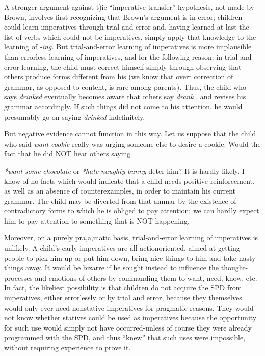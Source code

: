 A stronger argument against t)ie ``imperative transfer'' hypothesis,
not made by Brown, involves first recognizing that Brown's argument is in error; children could learn imperatives through trial and error and, having learned at last the list of verbs which could not be imperatives, simply apply that knowledge to the learning of \textit{{}-ing.} But trial-and-error learning of imperatives is more implausible than errorless learning of imperatives, and for the following reason: in trial-and-error learning, the child must correct himself simply through observing that others produce forms different from his (we know that overt correction of grammar, as opposed to content, is rare among parents). Thus, the child who says \textit{drinked} eventually becomes aware that others say \textit{drank} , and revises his grammar accordingly. If such things did not come to his attention, he would presumably go on saying \textit{d}\textit{rinked} indefinitely.

But negative evidence cannot function in this way. Let us sup\-pose that the child who said \textit{want} \textit{cookie} really was urging someone else to desire a cookie. Would the fact that he did NOT hear others saying

\textit{*want} \textit{some} \textit{chocolate} or \textit{*hate} \textit{naughty} \textit{bunny} deter him? It is hardly likely. I know of no facts which would indicate that a child needs positive reinforcement, as well as an absence of counterexamples, in order to maintain his current grammar. The child may be diverted from that ammar by the existence of contradictory forms to which he is obliged to pay attention; we can hardly expect him to pay atten\-tion to something that is NOT happening.

Moreover, on a purely pra,a,matic basis, trial-and-error learning of imperatives is unlikely. A child's early imperatives are all action\-oriented, aimed at getting people to pick him up or put him down, bring nice things to him and take nasty things away. It would be bizarre if he sought instead to influence the thought-processes and emotions of others by commanding them to want, need, know, etc. In fact, the likeliest possibility is that children do not acquire the SPD from imperatives, either errorlessly or by trial and error, because they them\-selves would only ever need nonstative imperatives for pragmatic reasons. They would not know whether statives could be used as imperatives because the opportunity for such use would simply not
have occurred-unless of course they were already programmed with the SPD, and thus ``knew'' that such uses were impossible, without requiring experience to prove it.

